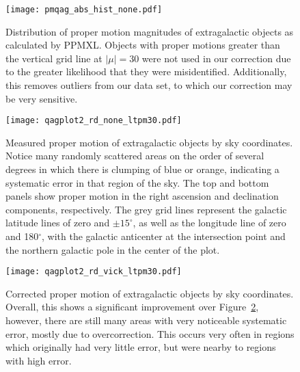 \documentclass[11pt,preprint]{aastex6}
\begin{document}
\begin{figure}
\centering
\texttt{[image: pmqag\_abs\_hist\_none.pdf]}
\caption{
	Distribution of proper motion magnitudes of extragalactic objects as calculated by PPMXL.
	Objects with proper motions greater than the vertical grid line at $|\mu|=30$ were not used in our correction due to the greater likelihood that they were misidentified.
	Additionally, this removes outliers from our data set, to which our correction may be very sensitive.
	\label{fig:pm_hist}
}
\end{figure}

\begin{figure}
\centering
\texttt{[image: qagplot2\_rd\_none\_ltpm30.pdf]}
\caption{
	Measured proper motion of extragalactic objects by sky coordinates.
	Notice many randomly scattered areas on the order of several degrees in which there is clumping of blue or orange, indicating a systematic error in that region of the sky.
	The top and bottom panels show proper motion in the right ascension and declination components, respectively.
	The grey grid lines represent the galactic latitude lines of zero and $\pm15^{\circ}$, as well as the longitude line of zero and 180$^{\circ}$, with the galactic anticenter at the intersection point and the northern galactic pole in the center of the plot.
	\label{fig:qag_none}
}
\end{figure}

\begin{figure}
\centering
\texttt{[image: qagplot2\_rd\_vick\_ltpm30.pdf]}
\caption{
	Corrected \citep{Vickers2016} proper motion of extragalactic objects by sky coordinates.
	Overall, this shows a significant improvement over Figure~\ref{fig:qag_none}, however, there are still many areas with very noticeable systematic error, mostly due to overcorrection.
	This occurs very often in regions which originally had very little error, but were nearby to regions with high error.
	\label{fig:qag_vick}
}
\end{figure}
\end{document}
